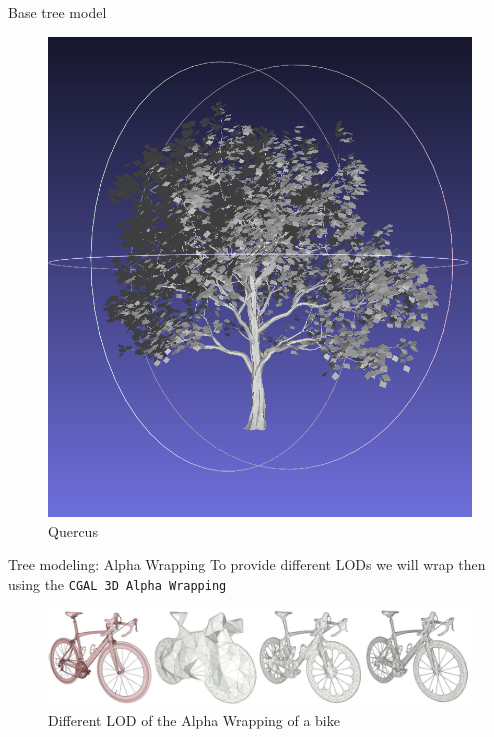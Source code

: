 \documentclass[10pt]{beamer}
\begin{document}
\begin{frame}{Base tree model}
\begin{figure}[H]
\begin{minipage}{0.24\textwidth}
        \includegraphics[width=\textwidth]{images/quercus.png}
        \caption{Quercus}
    \end{minipage}
\end{figure}
\end{frame}

\begin{frame}{Tree modeling: Alpha Wrapping}
  \Large
  To provide different LODs we will wrap then using the \texttt{CGAL 3D 
  Alpha Wrapping}
  \vfill
  \begin{figure}[H]
    \centering
        \centering
        \includegraphics[width=\textwidth]{images/aw3_bike_lod.jpg}
        \caption{Different LOD of the Alpha Wrapping of a bike}
\end{figure}
\end{frame}
\end{document}
